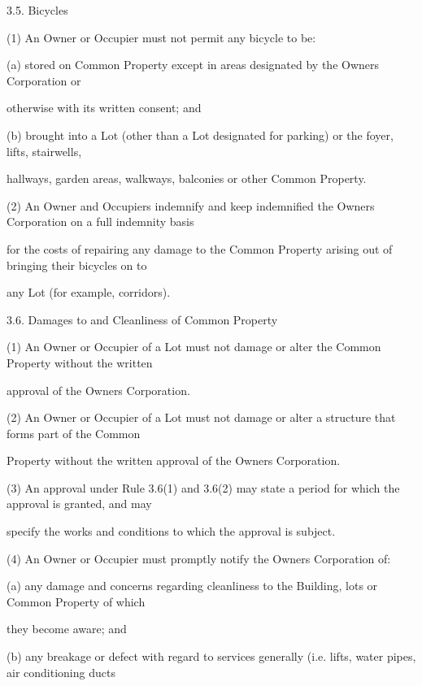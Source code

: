 \documentclass{article}
\begin{document}
{\fontsize{9.99}{1}3.5. Bicycles }

{\fontsize{9.962}{1}(1) An Owner or Occupier must not permit any bicycle to be: }

{\fontsize{9.962}{1}(a) stored on Common Property except in areas designated by the Owners Corporation or }

{\fontsize{10.02}{1}otherwise with its written consent; and }

{\fontsize{9.962}{1}(b) brought into a Lot (other than a Lot designated for parking) or the foyer, lifts, stairwells, }

{\fontsize{10.02}{1}hallways, garden areas, walkways, balconies or other Common Property. }

{\fontsize{9.962}{1}(2) An Owner and Occupiers indemnify and keep indemnified the Owners Corporation on a full indemnity basis }

{\fontsize{10.02}{1}for the costs of repairing any damage to the Common Property arising out of bringing their bicycles on to }

{\fontsize{10.02}{1}any Lot (for example, corridors). }

{\fontsize{9.99}{1}3.6. Damages to and Cleanliness of Common Property }

{\fontsize{9.962}{1}(1) An Owner or Occupier of a Lot must not damage or alter the Common Property without the written }

{\fontsize{10.02}{1}approval of the Owners Corporation. }

{\fontsize{9.962}{1}(2) An Owner or Occupier of a Lot must not damage or alter a structure that forms part of the Common }

{\fontsize{10.02}{1}Property without the written approval of the Owners Corporation. }

{\fontsize{9.962}{1}(3) An approval under Rule 3.6(1) and 3.6(2) may state a period for which the approval is granted, and may }

{\fontsize{10.02}{1}specify the works and conditions to which the approval is subject. }

{\fontsize{9.962}{1}(4) An Owner or Occupier must promptly notify the Owners Corporation of: }

{\fontsize{9.962}{1}(a) any damage and concerns regarding cleanliness to the Building, lots or Common Property of which }

{\fontsize{10.02}{1}they become aware; and }

{\fontsize{9.962}{1}(b) any breakage or defect with regard to services generally (i.e. lifts, water pipes, air conditioning ducts }
\end{document}
